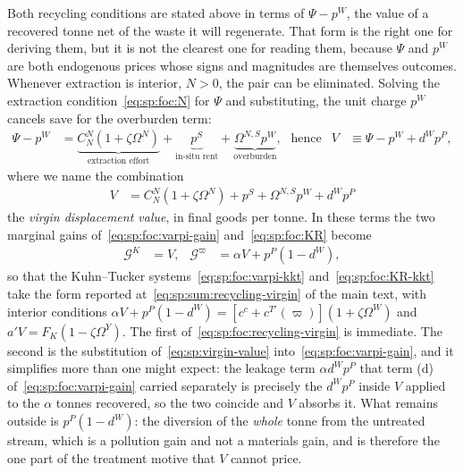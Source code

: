  Both recycling conditions are stated above in terms
of $\Psi-p^W$, the value of a recovered tonne net of the waste it will regenerate. That form is the
right one for deriving them, but it is not the clearest one for reading them, because $\Psi$ and
$p^W$ are both endogenous prices whose signs and magnitudes are themselves outcomes. Whenever
extraction is interior, $N>0$, the pair can be eliminated. Solving the extraction
condition~\eqref{eq:sp:foc:N} for $\Psi$ and substituting, the unit charge $p^W$ cancels save for the
overburden term:
\begin{align}
\Psi-p^W &= \underbrace{C^N_N\left(1+\zeta\Omega^N\right)}_{\text{extraction effort}}
+\underbrace{p^S}_{\text{in-situ rent}}
+\underbrace{\Omega^{N,S}p^W}_{\text{overburden}} ,
&&\text{hence}
&
V &\equiv \Psi-p^W+d^Wp^P ,
\label{eq:sp:virgin-value}
\end{align}
where we name the combination
\begin{align}
V &= C^N_N\left(1+\zeta\Omega^N\right)+p^S+\Omega^{N,S}p^W+d^Wp^P
\label{eq:sp:V}
\end{align}
the \emph{virgin displacement value}, in final goods per tonne. In these terms the two marginal gains
of~\eqref{eq:sp:foc:varpi-gain} and~\eqref{eq:sp:foc:KR} become
\begin{align}
\mathcal G^K &= V,
&
\mathcal G^\varpi &= \alpha V+p^P\left(1-d^W\right),
\label{eq:sp:foc:recycling-virgin}
\end{align}
so that the Kuhn--Tucker systems~\eqref{eq:sp:foc:varpi-kkt} and~\eqref{eq:sp:foc:KR-kkt} take the
form reported at~\eqref{eq:sp:sum:recycling-virgin} of the main text, with interior conditions
$\alpha V+p^P\left(1-d^W\right)=\left[c^c+c^{T\prime}\left(\varpi\right)\right]\left(1+\zeta\Omega^W\right)$ and
$a'V=F_K\left(1-\zeta\Omega^Y\right)$.
The first of~\eqref{eq:sp:foc:recycling-virgin} is immediate. The second is the substitution
of~\eqref{eq:sp:virgin-value} into~\eqref{eq:sp:foc:varpi-gain}, and it simplifies more than one might
expect: the leakage term $\alpha d^Wp^P$ that term (d) of~\eqref{eq:sp:foc:varpi-gain} carried separately
is precisely the $d^Wp^P$ inside $V$ applied to the $\alpha$ tonnes recovered, so the two coincide
and $V$ absorbs it. What remains outside is $p^P\left(1-d^W\right)$: the diversion of the
\emph{whole} tonne from the untreated stream, which is a pollution gain and not a materials gain, and
is therefore the one part of the treatment motive that $V$ cannot price.

